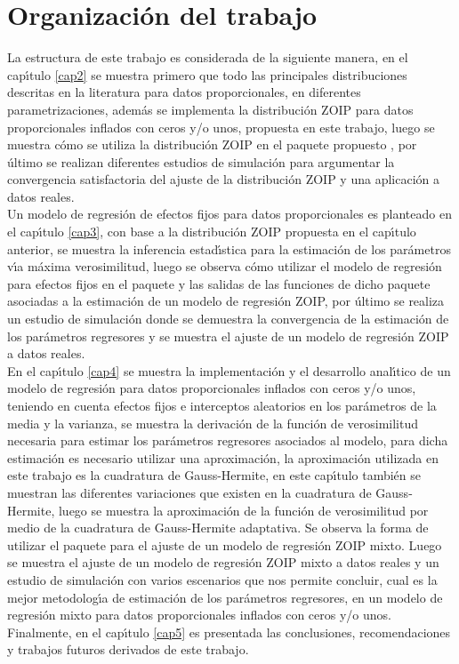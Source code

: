 \section{Organizaci\'{o}n del trabajo}

La estructura de este trabajo es considerada de la siguiente manera, en el cap\'{\i}tulo \ref{cap2} se muestra primero que todo las principales distribuciones descritas en la literatura para datos proporcionales, en diferentes parametrizaciones, adem\'{a}s se implementa la distribuci\'{o}n ZOIP para datos proporcionales inflados con ceros y/o unos, propuesta en este trabajo, luego se muestra c\'{o}mo se utiliza la distribuci\'{o}n ZOIP en el paquete propuesto , por \'{u}ltimo se realizan diferentes estudios de simulaci\'{o}n para argumentar la convergencia satisfactoria del ajuste de la distribuci\'{o}n ZOIP y una aplicaci\'{o}n a datos reales.\\

Un modelo de regresi\'{o}n de efectos fijos para datos proporcionales es planteado en el cap\'{\i}tulo \ref{cap3}, con base a la distribuci\'{o}n ZOIP propuesta en el cap\'{\i}tulo anterior, se muestra la inferencia estad\'{\i}stica para la estimaci\'{o}n de los par\'{a}metros v\'{\i}a m\'{a}xima verosimilitud, luego se observa c\'{o}mo utilizar el modelo de regresi\'{o}n para efectos fijos en el paquete  y las salidas de las funciones de dicho paquete asociadas a la estimaci\'{o}n de un modelo de regresi\'{o}n ZOIP, por \'{u}ltimo se realiza un estudio de simulaci\'{o}n donde se demuestra la convergencia de la estimaci\'{o}n de los par\'{a}metros regresores y se muestra el ajuste de un modelo de regresi\'{o}n ZOIP a datos reales.\\

En el cap\'{\i}tulo \ref{cap4} se muestra la implementaci\'{o}n y el desarrollo anal\'{\i}tico de un modelo de regresi\'{o}n para datos proporcionales inflados con ceros y/o unos, teniendo en cuenta efectos fijos e interceptos aleatorios en los par\'{a}metros de la media y la varianza, se muestra la derivaci\'{o}n de la funci\'{o}n de verosimilitud necesaria para estimar los par\'{a}metros regresores asociados al modelo, para dicha estimaci\'{o}n es necesario utilizar una aproximaci\'{o}n, la aproximaci\'{o}n utilizada en este trabajo es la cuadratura de Gauss-Hermite, en este cap\'{\i}tulo tambi\'{e}n se muestran las diferentes variaciones que existen en la cuadratura de Gauss-Hermite, luego se muestra la aproximaci\'{o}n de la funci\'{o}n de verosimilitud por medio de la cuadratura de Gauss-Hermite adaptativa. Se observa la forma de utilizar el paquete  para el ajuste de un modelo de regresi\'{o}n ZOIP mixto. Luego se muestra el ajuste de un modelo de regresi\'{o}n ZOIP mixto a datos reales y un estudio de simulaci\'{o}n con varios escenarios que nos permite concluir, cual es la mejor metodolog\'{\i}a de estimaci\'{o}n de los par\'{a}metros regresores, en un modelo de regresi\'{o}n mixto para datos proporcionales inflados con ceros y/o unos.\\

Finalmente, en el cap\'{\i}tulo \ref{cap5} es presentada las conclusiones, recomendaciones y trabajos futuros derivados de este trabajo.


 










